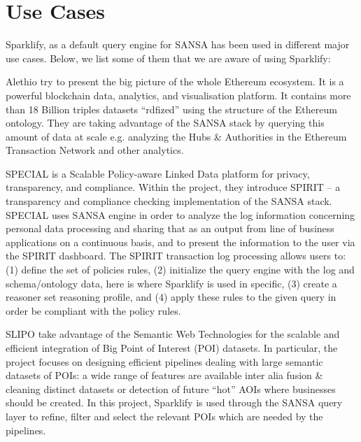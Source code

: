 \section{Use Cases}
\label{sec:use_cases}

Sparklify, as a default query engine for SANSA has been used in different major use cases.
Below, we list some of them that we are aware of using Sparklify:

 Alethio try to present the big picture of the whole Ethereum ecosystem.
It is a powerful blockchain data, analytics, and visualisation platform.
It contains more than 18 Billion triples datasets ``rdfized'' using the structure of the Ethereum ontology.
They are taking advantage of the SANSA stack by querying this amount of data at scale e.g. analyzing the Hubs \& Authorities in the Ethereum Transaction Network and other analytics.

SPECIAL is a Scalable Policy-aware Linked Data platform for privacy, transparency, and compliance.
Within the project, they introduce SPIRIT -- a transparency and compliance checking implementation of the SANSA stack.
SPECIAL uses SANSA engine in order to analyze the log information concerning personal data processing and sharing that as an output from line of business applications on a continuous basis, and to present the information to the user via the SPIRIT dashboard.
The SPIRIT transaction log processing allows users to: (1) define the set of policies rules, (2) initialize the query engine with the log and schema/ontology data, here is where Sparklify is used in specific, (3) create a reasoner set reasoning profile, and (4) apply these rules to the given query in order be compliant with the policy rules.

 SLIPO take advantage of the Semantic Web Technologies for the scalable and efficient integration of Big Point of Interest (POI) datasets.
In particular, the project focuses on designing efficient pipelines dealing with large semantic datasets of POIs: a wide range of features are available inter alia fusion \& cleaning distinct datasets or detection of future ``hot'' AOIs where businesses should be created.
In this project, Sparklify is used through the SANSA query layer to refine, filter and select the relevant POIs which are needed by the pipelines.

